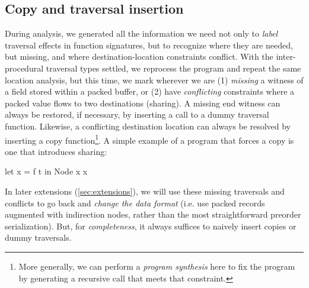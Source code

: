 \documentclass[a4paper,english]{lipics-v2016}
\begin{document}
\subsection{Copy and traversal insertion}\label{sec:copy-insert}

{During analysis, we generated all the information we need not only to {\em
    label} traversal effects in function signatures, but to recognize where they
  are needed, but missing, and where destination-location constraints conflict.}
%
  With the inter-procedural traversal types settled,
  we reprocess the program and repeat the same location analysis, but this time,
  we mark wherever we are (1) {\em missing} a witness of a field stored within a
  packed buffer, or (2) have {\em conflicting} constraints where a packed value
  flows to two destinations (sharing).
%
  A missing end witness can always be restored, if necessary, by inserting a
  call to a dummy traversal function.  Likewise, a conflicting destination
  location can always be resolved by inserting a copy function\footnote{More
    generally, we can perform a {\em program synthesis} here to fix the program
    by generating a recursive call that meets that constraint.
  }.
%
A simple example of a program that forces a copy is one that introduces sharing:
%
\begin{code}
let x = f t in  Node x x 
\end{code}

In later extensions (\cref{sec:extensions}), we will use these missing traversals and
conflicts to go back and {\em change the data format} (i.e. use packed records
{augmented} with indirection nodes, rather than the most straightforward
preorder serialization).
%
But, for {\em completeness}, it always suffices to naively insert copies or dummy
traversals.
\end{document}
